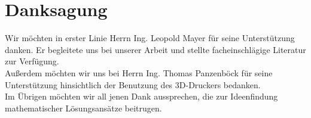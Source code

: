 \section{Danksagung}
Wir möchten in erster Linie Herrn Ing. Leopold Mayer für seine Unterstützung danken. Er begleitete uns bei unserer Arbeit und stellte facheinschlägige Literatur zur Verfügung.\\
Außerdem möchten wir uns bei Herrn Ing. Thomas Panzenböck für seine Unterstützung hinsichtlich der Benutzung des 3D-Druckers bedanken.\\
Im Übrigen möchten wir all jenen Dank aussprechen, die zur Ideenfindung mathematischer Lösungsansätze beitrugen.